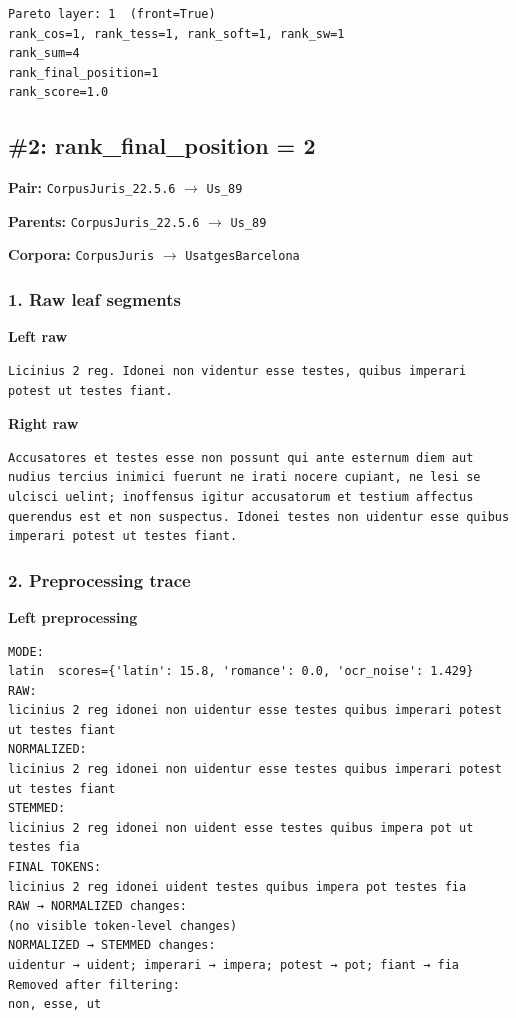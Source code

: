 \begin{lstlisting}[breaklines=true,basicstyle=\ttfamily\small]
Pareto layer: 1  (front=True)
rank_cos=1, rank_tess=1, rank_soft=1, rank_sw=1
rank_sum=4
rank_final_position=1
rank_score=1.0
\end{lstlisting}

\subsection{\#2: rank\_final\_position = 2}

\textbf{Pair:} \texttt{CorpusJuris\_22.5.6} $\rightarrow$ \texttt{Us\_89}

\textbf{Parents:} \texttt{CorpusJuris\_22.5.6} $\rightarrow$ \texttt{Us\_89}

\textbf{Corpora:} \texttt{CorpusJuris} $\rightarrow$ \texttt{UsatgesBarcelona}

\subsubsection{1. Raw leaf segments}

\textbf{Left raw} 

\begin{lstlisting}[breaklines=true,basicstyle=\ttfamily\small]
Licinius 2 reg. Idonei non videntur esse testes, quibus imperari potest ut testes fiant.
\end{lstlisting}

\textbf{Right raw} 

\begin{lstlisting}[breaklines=true,basicstyle=\ttfamily\small]
Accusatores et testes esse non possunt qui ante esternum diem aut nudius tercius inimici fuerunt ne irati nocere cupiant, ne lesi se ulcisci uelint; inoffensus igitur accusatorum et testium affectus querendus est et non suspectus. Idonei testes non uidentur esse quibus imperari potest ut testes fiant.
\end{lstlisting}

\subsubsection{2. Preprocessing trace}

\textbf{Left preprocessing} 

\begin{lstlisting}[breaklines=true,basicstyle=\ttfamily\small]
MODE:
latin  scores={'latin': 15.8, 'romance': 0.0, 'ocr_noise': 1.429}
RAW:
licinius 2 reg idonei non uidentur esse testes quibus imperari potest ut testes fiant
NORMALIZED:
licinius 2 reg idonei non uidentur esse testes quibus imperari potest ut testes fiant
STEMMED:
licinius 2 reg idonei non uident esse testes quibus impera pot ut testes fia
FINAL TOKENS:
licinius 2 reg idonei uident testes quibus impera pot testes fia
RAW → NORMALIZED changes:
(no visible token-level changes)
NORMALIZED → STEMMED changes:
uidentur → uident; imperari → impera; potest → pot; fiant → fia
Removed after filtering:
non, esse, ut
\end{lstlisting}

